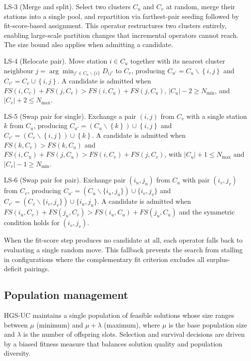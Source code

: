 \documentclass[11pt]{article}
\numberwithin{table}{section}
\numberwithin{figure}{section}
\begin{document}
LS-3 (Merge and split). Select two clusters ${{C}_{u}}$ and ${{C}_{v}}$ at random, merge their stations into a single pool, and repartition via farthest-pair seeding followed by fit-score-based assignment. This operator restructures two clusters entirely, enabling large-scale partition changes that incremental operators cannot reach. The size bound also applies when admitting a candidate.

LS-4 (Relocate pair). Move station $i\in {{C}_{u}}$ together with its nearest cluster neighbour $j=\arg {{\min }_{{j}'\in {{C}_{u}}\backslash \{i\}}}{{D}_{i{j}'}}$ to ${{C}_{v}}$, producing ${{C}_{{{u}'}}}={{C}_{u}}\backslash \left\{ i,j \right\}$ and ${{C}_{{{v}'}}}={{C}_{v}}\cup \left\{ i,j \right\}$. A candidate is admitted when $FS(i,{{C}_{v}})+FS(j,{{C}_{v}})>FS(i,{{C}_{u}})+FS(j,{{C}_{u}})$, $|{{C}_{u}}|-2\ge {{N}_{\min }}$, and $|{{C}_{v}}|+2\le {{N}_{\max }}$.

LS-5 (Swap pair for single). Exchange a pair $(i,j)$ from ${{C}_{v}}$ with a single station $k$ from ${{C}_{u}}$, producing ${{C}_{{{u}'}}}=({{C}_{u}}\backslash \left\{ k \right\})\cup \left\{ i,j \right\}$ and ${{C}_{{{v}'}}}=({{C}_{v}}\backslash \left\{ i,j \right\})\cup \left\{ k \right\}$. A candidate is admitted when $FS(k,{{C}_{v}})>FS(k,{{C}_{u}})$ and $FS(i,{{C}_{u}})+FS(j,{{C}_{u}})>FS(i,{{C}_{v}})+FS(j,{{C}_{v}})$, with $|{{C}_{u}}|+1\le {{N}_{\max }}$ and $|{{C}_{v}}|-1\ge {{N}_{\min }}$.

LS-6 (Swap pair for pair). Exchange pair $({{i}_{u}},{{j}_{u}})$ from ${{C}_{u}}$ with pair $({{i}_{v}},{{j}_{v}})$ from ${{C}_{v}}$, producing ${{C}_{{{u}'}}}=({{C}_{u}}\backslash \{{{i}_{u}},{{j}_{u}}\})\cup \{{{i}_{v}},{{j}_{v}}\}$ and ${{C}_{{{v}'}}}=({{C}_{v}}\backslash \{{{i}_{v}},{{j}_{v}}\})\cup \{{{i}_{u}},{{j}_{u}}\}$. A candidate is admitted when $FS({{i}_{u}},{{C}_{v}})+FS({{j}_{u}},{{C}_{v}})>FS({{i}_{u}},{{C}_{u}})+FS({{j}_{u}},{{C}_{u}})$ and the symmetric condition holds for $({{i}_{v}},{{j}_{v}})$.

When the fit-score step produces no candidate at all, each operator falls back to evaluating a single random move. This fallback prevents the search from stalling in configurations where the complementary fit criterion excludes all surplus-deficit pairings.

\subsection{Population management}

HGS-UC maintains a single population of feasible solutions whose size ranges between $\mu $ (minimum) and $\mu +\lambda $ (maximum), where $\mu $ is the base population size and $\lambda $ is the number of offspring slots. Selection and survival decisions are driven by a biased fitness measure that balances solution quality and population diversity.
\end{document}

